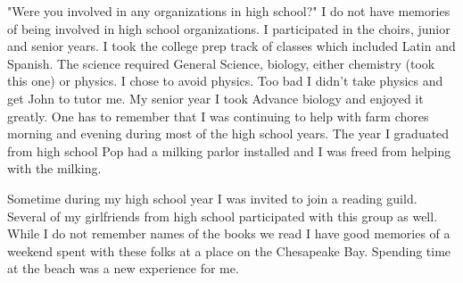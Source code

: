 "Were you involved in any organizations in high school?"
I do not have memories of being involved in high school organizations.
I participated in the choirs, junior and senior years.
I took the college prep track of classes which included Latin and Spanish.
The science required General Science, biology, either chemistry (took this one) or physics.
I chose to avoid physics.
Too bad I didn't take physics and get John to tutor me.
My senior year I took Advance biology and enjoyed it greatly.
One has to remember that I was continuing to help with farm chores morning and evening during most of the high school years.
The year I graduated from high school Pop had a milking parlor installed and I was freed from helping with the milking.

Sometime during my high school year I was invited to join a reading guild.
Several of my girlfriends from high school participated with this group as well.
While I do not remember names of the books we read I have good memories of a weekend spent with these folks at a place on the Chesapeake Bay.
Spending time at the beach was a new experience for me.






